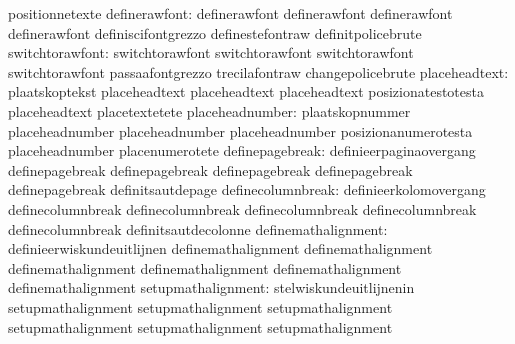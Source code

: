                                   positionnetexte
                   definerawfont: definerawfont                    definerawfont
                                  definerawfont                    definerawfont
                                  definiscifontgrezzo              definestefontraw
                                  definitpolicebrute
                 switchtorawfont: switchtorawfont                  switchtorawfont
                                  switchtorawfont                  switchtorawfont
                                  passaafontgrezzo                 trecilafontraw
                                  changepolicebrute
                   placeheadtext: plaatskoptekst                   placeheadtext
                                  placeheadtext                    placeheadtext
                                  posizionatestotesta              placeheadtext
                                  placetextetete
                 placeheadnumber: plaatskopnummer                  placeheadnumber
                                  placeheadnumber                  placeheadnumber
                                  posizionanumerotesta             placeheadnumber
                                  placenumerotete
                 definepagebreak: definieerpaginaovergang          definepagebreak
                                  definepagebreak                  definepagebreak
                                  definepagebreak                  definepagebreak
                                  definitsautdepage
               definecolumnbreak: definieerkolomovergang           definecolumnbreak
                                  definecolumnbreak                definecolumnbreak
                                  definecolumnbreak                definecolumnbreak
                                  definitsautdecolonne
             definemathalignment: definieerwiskundeuitlijnen       definemathalignment
                                  definemathalignment              definemathalignment
                                  definemathalignment              definemathalignment
                                  definemathalignment
              setupmathalignment: stelwiskundeuitlijnenin          setupmathalignment
                                  setupmathalignment               setupmathalignment
                                  setupmathalignment               setupmathalignment
                                  setupmathalignment

\stopcommands


